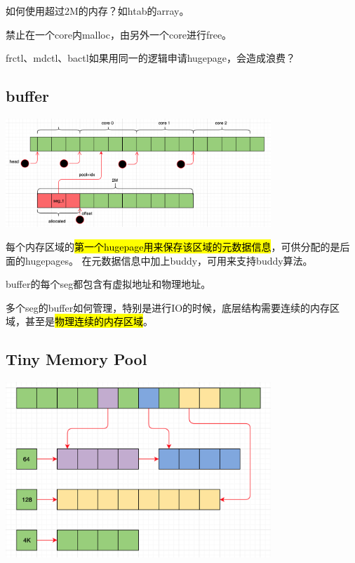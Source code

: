 如何使用超过2M的内存？如htab的array。

禁止在一个core内malloc，由另外一个core进行free。

frctl、mdctl、bactl如果用同一的逻辑申请hugepage，会造成浪费？

\subsection{buffer}

\begin{center}
    \includegraphics[width=10cm]{../imgs/buffer-t.png}
\end{center}

每个内存区域的\hl{第一个hugepage用来保存该区域的元数据信息}，可供分配的是后面的hugepages。
在元数据信息中加上buddy，可用来支持buddy算法。

buffer的每个seg都包含有虚拟地址和物理地址。

多个seg的buffer如何管理，特别是进行IO的时候，底层结构需要连续的内存区域，甚至是\hl{物理连续的内存区域}。

\subsection{Tiny Memory Pool}

\begin{center}
    \includegraphics[width=10cm]{../imgs/memory-pool.png}
\end{center}


